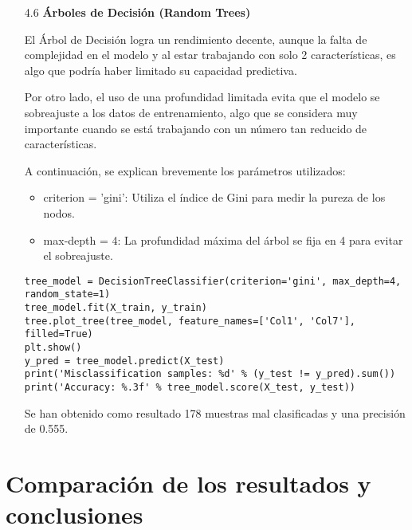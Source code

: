 \documentclass{article}
\begin{document}
\newpage

\begin{itemize}

\item[4.6]  {\bf \'Arboles de Decisi\'on (Random Trees)}

El \'Arbol de Decisi\'on logra un rendimiento decente, aunque la falta de complejidad en el modelo y al estar trabajando con solo 2 caracter\'isticas, es algo que podr\'ia haber limitado su capacidad predictiva.

Por otro lado, el uso de una profundidad limitada evita que el modelo se sobreajuste a los datos de entrenamiento, algo que se considera muy importante cuando se est\'a trabajando con un n\'umero tan reducido de caracter\'isticas.

A continuaci\'on, se explican brevemente los par\'ametros utilizados:

\begin{itemize}

\item
criterion = 'gini': Utiliza el \'indice de Gini para medir la pureza de los nodos.

\item
max-depth = 4: La profundidad m\'axima del árbol se fija en 4 para evitar el sobreajuste.

\end{itemize}

\begin{tcolorbox}[width=14cm]
\begin{scriptsize}
\begin{verbatim}
tree_model = DecisionTreeClassifier(criterion='gini', max_depth=4, random_state=1)
tree_model.fit(X_train, y_train)
tree.plot_tree(tree_model, feature_names=['Col1', 'Col7'], filled=True)
plt.show()
y_pred = tree_model.predict(X_test)
print('Misclassification samples: %d' % (y_test != y_pred).sum())
print('Accuracy: %.3f' % tree_model.score(X_test, y_test))
\end{verbatim}
\end{scriptsize}
\end{tcolorbox}

Se han obtenido como resultado 178 muestras mal clasificadas y una precisi\'on de 0.555.

\end{itemize}


\newpage

\section[5]{Comparaci\'on de los resultados y conclusiones}
\end{document}
